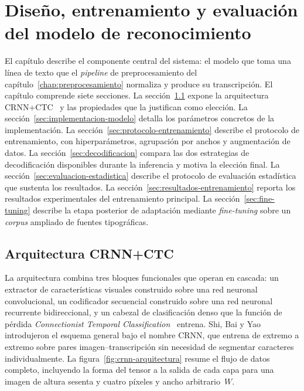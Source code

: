 \setcounter{chapter}{3}

\chapter{Diseño, entrenamiento y evaluación del modelo de reconocimiento}\label{chap:modelo}

El capítulo describe el componente central del sistema: el modelo que toma una línea de texto que el \textit{pipeline} de preprocesamiento del capítulo~\ref{chap:preprocesamiento} normaliza y produce su transcripción. El capítulo comprende siete secciones. La sección~\ref{sec:arquitectura} expone la arquitectura CRNN+CTC~\cite{shi2016crnn,graves2006ctc} y las propiedades que la justifican como elección. La sección~\ref{sec:implementacion-modelo} detalla los parámetros concretos de la implementación. La sección~\ref{sec:protocolo-entrenamiento} describe el protocolo de entrenamiento, con hiperparámetros, agrupación por anchos y augmentación de datos. La sección~\ref{sec:decodificacion} compara las dos estrategias de decodificación disponibles durante la inferencia y motiva la elección final. La sección~\ref{sec:evaluacion-estadistica} describe el protocolo de evaluación estadística que sustenta los resultados. La sección~\ref{sec:resultados-entrenamiento} reporta los resultados experimentales del entrenamiento principal. La sección~\ref{sec:fine-tuning} describe la etapa posterior de adaptación mediante \textit{fine-tuning} sobre un \textit{corpus} ampliado de fuentes tipográficas.

\section{Arquitectura CRNN+CTC}
\label{sec:arquitectura}

La arquitectura combina tres bloques funcionales que operan en cascada: un extractor de características visuales construido sobre una red neuronal convolucional, un codificador secuencial construido sobre una red neuronal recurrente bidireccional, y un cabezal de clasificación denso que la función de pérdida \textit{Connectionist Temporal Classification}~\cite{graves2006ctc} entrena. Shi, Bai y Yao~\cite{shi2016crnn} introdujeron el esquema general bajo el nombre CRNN, que entrena de extremo a extremo sobre pares imagen--transcripción sin necesidad de segmentar caracteres individualmente. La figura~\ref{fig:crnn-arquitectura} resume el flujo de datos completo, incluyendo la forma del tensor a la salida de cada capa para una imagen de altura sesenta y cuatro píxeles y ancho arbitrario~$W$.

